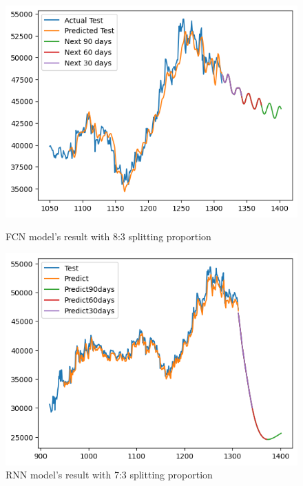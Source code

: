 \documentclass{ieeeojies}
\begin{document}
\begin{figure}[H]
    \centering
    \begin{minipage}{0.45\linewidth}
        \centering
        \includegraphics[width=\linewidth]{bibliography/diagram/FCN-BID.png}
        \caption{FCN model’s result with 8:3 splitting proportion}
        \label{fig:FCN-BID}
    \end{minipage}
    \hfill
    \begin{minipage}{0.45\linewidth}
        \centering
        \includegraphics[width=\linewidth]{bibliography/diagram/RNN-BID.png}
        \caption{RNN model’s result with 7:3 splitting proportion}
        \label{fig:RNN-BID}
    \end{minipage}
\end{figure}
\end{document}
